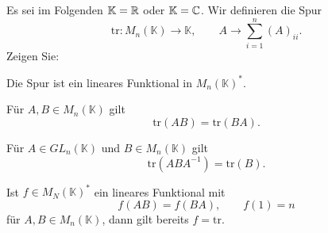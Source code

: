 \begin{Problem}
	Es sei im Folgenden $\mathbb{K}=\mathbb{R}$ oder $\mathbb{K}=\mathbb{C}$. Wir definieren die Spur
	\[
		\text{tr}:M_n(\mathbb{K})\to \mathbb{K}, \qquad A \to \sum_{i=1}^n (A)_{ii}
	.\] 
	Zeigen Sie:
	\begin{parts}
	\item Die Spur ist ein lineares Funktional in $M_n(\mathbb{K})^*$.
	\item F\"{u}r $A,B\in M_n(\mathbb{K})$ gilt
		\[ 
			\text{tr}(AB)=\text{tr}(BA)
		.\] 
	\item F\"{u}r $A\in GL_n(\mathbb{K})$ und $B\in M_n(\mathbb{K})$ gilt
		\[
			\text{tr}(ABA^{-1})=\text{tr}(B)
		.\] 
	\item Ist $f\in M_N(\mathbb{K})^*$ ein lineares Funktional mit
		\[
		f(AB)=f(BA),\qquad f(1)=n\] 
		f\"{u}r $A,B\in M_n(\mathbb{K})$, dann gilt bereits $f=\text{tr}$.
	\end{parts}
\end{Problem}
